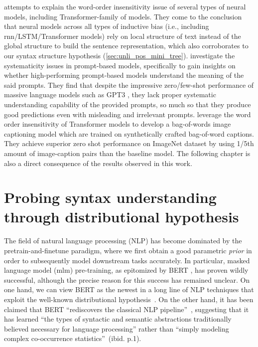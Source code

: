 \documentclass[letterpaper, 12pt]{report}
\begin{document}
\cite{clouatre-etal-2022-local} attempts to explain the word-order insensitivity issue of several types of neural models, including Transformer-family of models. They come to the conclusion that neural models across all types of inductive bias (i.e., including \acrshort{rnn}/LSTM/Transformer models) rely on local structure of text instead of the global structure to build the sentence representation, which also corroborates to our syntax structure hypothesis (\autoref{sec:unli_pos_mini_tree}).
\cite{websonPavlick2022} investigate the systematicity issues in prompt-based models, specifically to gain insights on whether high-performing prompt-based models understand the meaning of the said prompts. They find that despite the impressive zero/few-shot performance of massive language models such as GPT3 \citep{Brown2020:GPT3}, they lack proper systematic understanding capability of the provided prompts, so much so that they produce good predictions even with misleading and irrelevant prompts.
\citet{Tejankar2021AFO} leverage the word order insensitivity of Transformer models to develop a bag-of-words image captioning model which are trained on synthetically crafted bag-of-word captions. They achieve superior zero shot performance on ImageNet dataset by using 1/5th amount of image-caption pairs than the baseline model.
The following chapter is also a direct consequence of the results observed in this work.

\clearpage
\chapter{Probing syntax understanding through distributional hypothesis}
\label{sec:mlm}

The field of natural language processing (NLP) has become dominated by the pretrain-and-finetune paradigm, where we first obtain a good parametric \emph{prior} in order to subsequently model downstream tasks accurately.
In particular, masked language model (\acrshort{mlm}) pre-training, as epitomized by BERT \citep{devlin-etal-2019-bert}, has proven wildly successful, although the precise reason for this success has remained unclear.
On one hand, we can view BERT as the newest in a long line of NLP techniques  \citep{deerwester1990indexing, landauer1997solution, collobert2008unified, mikolov2013, peters-etal-2018-deep} that exploit the well-known distributional hypothesis~\citep{harris1954distributional}.
On the other hand, it has been claimed that BERT ``rediscovers the classical NLP pipeline''~\citep{tenney-etal-2019-bert}, suggesting that it has learned ``the types of syntactic and semantic abstractions traditionally believed necessary for language processing''
rather than ``simply modeling complex co-occurrence statistics''~(ibid. p.1).
\end{document}
